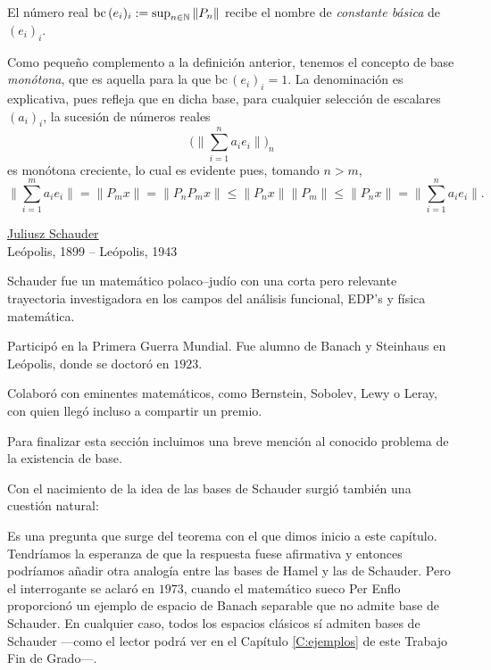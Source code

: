 	\begin{definition}
		El número real $\text{bc}\,(e_i)_i:=\sup_{n\in\mathbb{N}}\|P_n\|$ recibe el nombre de \emph{constante básica} de $(e_i)_i$.
	\end{definition}
	
	Como pequeño complemento a la definición anterior, tenemos el concepto de base \textit{monótona}, que es aquella para la que $\text{bc}\,(e_i)_i = 1$. La denominación es explicativa, pues refleja que en dicha base, para cualquier selección de escalares $(a_i)_i$, la sucesión de números reales
	\[\Big(\big\|\sum_{i=1}^na_ie_i\big\|\Big)_n\]
	es monótona creciente, lo cual es evidente pues, tomando $n>m$,
	\[\big\|\sum_{i=1}^m a_ie_i\big\|=\|P_mx\|=\|P_nP_mx\|\leq \|P_nx\|\|P_m\|\leq \|P_nx\|= \big\|\sum_{i=1}^n a_ie_i\big\|.\]
	
	
	\begin{center}
		\begin{minipage}{0.35\textwidth}\centering\small
			\href{https://mathshistory.st-andrews.ac.uk/Biographies/Schauder/}{Juliusz Schauder}\\
			Leópolis, 1899 – Leópolis, 1943
		\end{minipage}
		\begin{minipage}{0.60\textwidth}
			
			Schauder fue un matemático polaco--judío con una corta pero relevante trayectoria investigadora en los campos del análisis funcional, EDP's y física matemática.\smallskip
			
			Participó en la Primera Guerra Mundial. Fue alumno de Banach y Steinhaus en Leópolis, donde se doctoró en $1923$.\smallskip
			
			Colaboró con eminentes matemáticos, como Bernstein, Sobolev, Lewy o Leray, con quien llegó incluso a compartir un premio.
		\end{minipage}
	\end{center}\medskip
	
	Para finalizar esta sección incluimos una breve mención al conocido problema de la existencia de base.
	
	Con el nacimiento de la idea de las bases de Schauder surgió también una cuestión natural:
	
	Es una pregunta que surge del teorema con el que dimos inicio a este capítulo. Tendríamos la esperanza de que la respuesta fuese afirmativa y entonces podríamos añadir otra analogía entre las bases de Hamel y las de Schauder. Pero el interrogante se aclaró en $1973$, cuando el matemático sueco Per Enflo \cite{Enflo1973} proporcionó un ejemplo de espacio de Banach separable que no admite base de Schauder. En cualquier caso, todos los espacios clásicos sí admiten bases de Schauder ---como el lector podrá ver en el Capítulo \ref{C:ejemplos} de este Trabajo Fin de Grado---.
	
